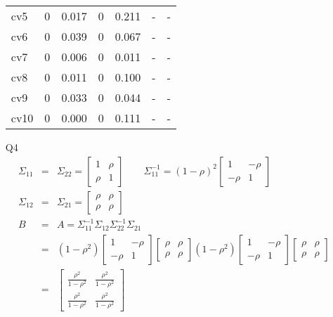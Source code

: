 \documentclass{article}
\begin{document}
\begin{itemize}
\begin{tabular}{l | c c | c c | c c |}
cv5 & 0 & 0.017 & 0 & 0.211 & - & - \\
cv6 & 0 & 0.039 & 0 & 0.067 & - & - \\
cv7 & 0 & 0.006 & 0 & 0.011 & - & - \\
cv8 & 0 & 0.011 & 0 & 0.100 & - & - \\
cv9 & 0 & 0.033 & 0 & 0.044 & - & - \\
cv10 & 0 & 0.000 & 0 & 0.111 & - & - \\
\end{tabular}
\item[Q4]
\begin{eqnarray*}
\Sigma_{11} & = & \Sigma_{22} = \begin{bmatrix}
1 & \rho \\
\rho & 1
\end{bmatrix} \qquad \Sigma_{11}^{-1} = (1- \rho)^2 \begin{bmatrix}
1 & -\rho \\
-\rho & 1
\end{bmatrix} \\
\Sigma_{12} & = & \Sigma_{21} = \begin{bmatrix}
\rho & \rho \\
\rho & \rho
\end{bmatrix} \\
B & = & A = \Sigma_{11}^{-1}\Sigma_{12}\Sigma_{22}^{-1}\Sigma_{21} \\
& = & (1 - \rho^2)\begin{bmatrix}
1 & -\rho \\
-\rho & 1
\end{bmatrix} \begin{bmatrix}
\rho & \rho \\
\rho & \rho
\end{bmatrix}  (1 - \rho^2)\begin{bmatrix}
1 & -\rho \\
-\rho & 1
\end{bmatrix} \begin{bmatrix}
\rho & \rho \\
\rho & \rho
\end{bmatrix}\\
& = & \begin{bmatrix}
\frac{\rho^2}{1 - \rho^2} & \frac{\rho^2}{1 - \rho^2} \\
\frac{\rho^2}{1 - \rho^2} & \frac{\rho^2}{1 - \rho^2}
\end{bmatrix}
\end{eqnarray*}
\begin{equation*}

\end{equation*}
\end{itemize}
\end{document}
